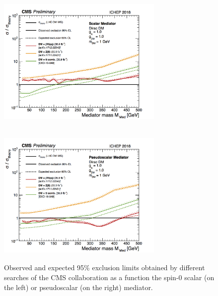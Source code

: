\documentclass[a4paper, 10pt, openright]{report}
\begin{document}
\begin{figure}[htbp]
\centering
\begin{minipage}[b]{.47\textwidth}
\includegraphics[width=8cm, height=7cm]{figs/SummaryScalar.png}
\end{minipage}\hfill
\begin{minipage}[b]{.47\textwidth}
\includegraphics[width=8cm, height=7cm]{figs/SummaryPseudoScalar.png}
\end{minipage} \hfill
\caption{Observed and expected 95\% exclusion limits obtained by different searches of the \ac{CMS} collaboration as a function the spin-0 scalar (on the left) or pseudoscalar (on the right) mediator.}
\label{fig:SummarySpin0}
\end{figure}
\end{document}
